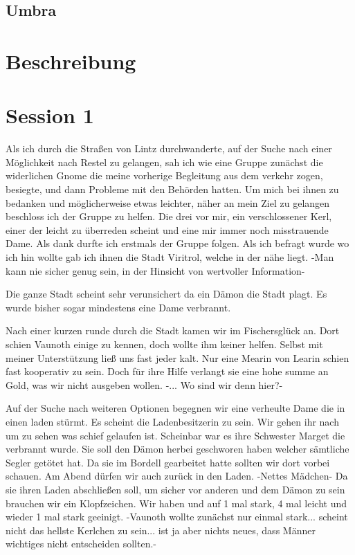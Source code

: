 \documentclass[10pt,twoside,twocolumn,openany]{book}
\begin{document}
	\section{Umbra}
	
	\chapter{Beschreibung}
	
	\chapter{Session 1}
	Als ich durch die Straßen von Lintz durchwanderte, auf der Suche nach einer Möglichkeit nach Restel zu gelangen, sah ich wie eine Gruppe zunächst die widerlichen Gnome die meine vorherige Begleitung aus dem verkehr zogen, besiegte, und dann Probleme mit den Behörden hatten. Um mich bei ihnen zu bedanken und möglicherweise etwas leichter, näher an mein Ziel zu gelangen beschloss ich der Gruppe zu helfen. Die drei vor mir, ein verschlossener Kerl, einer der leicht zu überreden scheint und eine mir immer noch misstrauende Dame. Als dank durfte ich erstmals der Gruppe folgen. Als ich befragt wurde wo ich hin wollte gab ich ihnen die Stadt Viritrol, welche in der nähe liegt. -Man kann nie sicher genug sein, in der Hinsicht von wertvoller Information-
	
	Die ganze Stadt scheint sehr verunsichert da ein Dämon die Stadt plagt. Es wurde bisher sogar mindestens eine Dame verbrannt. 
	
	Nach einer kurzen runde durch die Stadt kamen wir im Fischersglück an. Dort schien Vaunoth einige zu kennen, doch wollte ihm keiner helfen. Selbst mit meiner Unterstützung ließ uns fast jeder kalt. Nur eine Mearin von Learin schien fast kooperativ zu sein. Doch für ihre Hilfe verlangt sie eine hohe summe an Gold, was wir nicht ausgeben wollen. -... Wo sind wir denn hier?-
	
	Auf der Suche nach weiteren Optionen begegnen wir eine verheulte Dame die in einen laden stürmt. Es scheint die Ladenbesitzerin zu sein. Wir gehen ihr nach um zu sehen was schief gelaufen ist. Scheinbar war es ihre Schwester Marget die verbrannt wurde. Sie soll den Dämon herbei geschworen haben welcher sämtliche Segler getötet hat. Da sie im Bordell gearbeitet hatte sollten wir dort vorbei schauen. Am Abend dürfen wir auch zurück in den Laden. -Nettes Mädchen- Da sie ihren Laden abschließen soll, um sicher vor anderen und dem Dämon zu sein brauchen wir ein Klopfzeichen. Wir haben und auf 1 mal stark, 4 mal leicht und wieder 1 mal stark geeinigt. -Vaunoth wollte zunächst nur einmal stark... scheint nicht das hellste Kerlchen zu sein... ist ja aber nichts neues, dass Männer wichtiges nicht entscheiden sollten.- 
	
\end{document}
